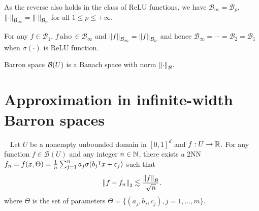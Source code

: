As the reverse also holds in the class of ReLU functions,  we have
$\mathcal{B}_{\infty} = \mathcal{B}_p$, $\left\| {\cdot} \right\|_{\mathcal{B}_{\infty}} =
    \left\| {\cdot} \right\|_{\mathcal{B}_{p}}$  for all $1 \leq p \leq +\infty$.

\begin{proposition}
    \label{prop:equivalence_barron_space}

    For any $f \in \mathcal{B}_1$, $f
        \,\text{also}\, \in \mathcal{B}_{\infty}$ and $\left\| {f} \right\|_{\mathcal{B}_{\infty}} =
        \left\| {f} \right\|_{\mathcal{B}_{p}}$ and hence $ \mathcal{B}_{\infty} = \cdots =
        \mathcal{B}_{2} = \mathcal{B}_1$ when $\sigma(\cdot)$ is ReLU function.
\end{proposition}

\begin{proposition}
    \label{prop:barron_space_is_banach}
    Barron space $\mathcal{B}(U)$ is a Banach space with norm
    $\left\| \cdot \right\|_{\mathcal{B}}$.
\end{proposition}


\section{Approximation in infinite-width Barron spaces}
\label{sec:approximation_in_infinite_width}

\begin{theorem} \
    \label{thm:barron_direct_appro_l2}
    Let $U$ be a nonempty unbounded domain in $[0,1]^d$ and $f: U \to \mathbb{R}$. For
    any function $f \in \mathcal{B}(U)$ and any integer $n \in \mathbb{N}$, there
    exists a 2NN $f_n = f(x, \Theta) = \frac{1}{n}\sum_{j=1}^n a_j \sigma(b_j{}^{\intercal}
    x + c_j)$ such that
    \begin{equation}
        \left\| f - f_n \right\|_2 \lesssim \frac{\left\| f \right\|_{\mathcal{B}}}{\sqrt{n}}.
    \end{equation}
    where $\Theta$ is the set of parameters $\Theta = \{(a_j, b_j, c_j),
    j=1,\dots,m\}$.

\end{theorem}


